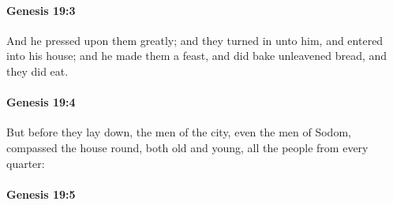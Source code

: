 
		\paragraph{Genesis 19:3} %
			\label{GENESIS-19-3}

			And he pressed upon them greatly; and they turned in unto him, and entered into his house; and he made them a feast, and did bake unleavened bread, and they did eat.


		\paragraph{Genesis 19:4} %
			\label{GENESIS-19-4}

			But before they lay down, the men of the city, even the men of Sodom, compassed the house round, both old and young, all the people from every quarter:


		\paragraph{Genesis 19:5} %
			\label{GENESIS-19-5}


